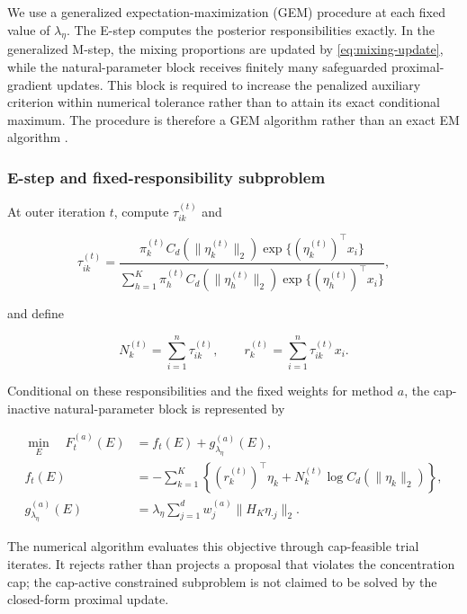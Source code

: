 \documentclass[preprint,12pt,authoryear]{elsarticle}
\newcounter{algorithm}
\begin{document}
We use a generalized expectation-maximization (GEM) procedure at each fixed
value of $\lambda_\eta$. The E-step computes the posterior responsibilities
exactly. In the generalized M-step, the mixing proportions are updated by
\eqref{eq:mixing-update}, while the natural-parameter block receives finitely
many safeguarded proximal-gradient updates. This block is required to increase
the penalized auxiliary criterion within numerical tolerance rather than to
attain its exact conditional maximum. The procedure is therefore a GEM
algorithm rather than an exact EM algorithm
\citep{dempster1977em,green1990penalizedem}.

\subsubsection{E-step and fixed-responsibility subproblem}
\label{sec:fixed-responsibility}

At outer iteration $t$, compute $\tau_{ik}^{(t)}$ and

\begin{equation}
\label{eq:responsibilities}
\tau_{ik}^{(t)}
=\frac{\pi_k^{(t)}C_d(\lVert\eta_k^{(t)}\rVert_2)
\exp\{(\eta_k^{(t)})^\top x_i\}}
{\sum_{h=1}^K\pi_h^{(t)}C_d(\lVert\eta_h^{(t)}\rVert_2)
\exp\{(\eta_h^{(t)})^\top x_i\}},
\end{equation}

and define

\[
N_k^{(t)}=\sum_{i=1}^n\tau_{ik}^{(t)},
\qquad
r_k^{(t)}=\sum_{i=1}^n\tau_{ik}^{(t)}x_i.
\]

Conditional on these responsibilities and the fixed weights for method $a$,
the cap-inactive natural-parameter block is represented by

\begin{equation}
\label{eq:fixed-responsibility-objective}
\begin{aligned}
\min_E\quad F_t^{(a)}(E)
&=f_t(E)+g_{\lambda_\eta}^{(a)}(E),\\
f_t(E)
&=-\sum_{k=1}^K
\left\{
(r_k^{(t)})^\top\eta_k
+N_k^{(t)}\log C_d(\lVert\eta_k\rVert_2)
\right\},\\
g_{\lambda_\eta}^{(a)}(E)
&=\lambda_\eta\sum_{j=1}^d
w_j^{(a)}\lVert H_K\eta_{\cdot j}\rVert_2.
\end{aligned}
\end{equation}

The numerical algorithm evaluates this objective through cap-feasible trial
iterates. It rejects rather than projects a proposal that violates the
concentration cap; the cap-active constrained subproblem is not claimed to be
solved by the closed-form proximal update.
\end{document}
